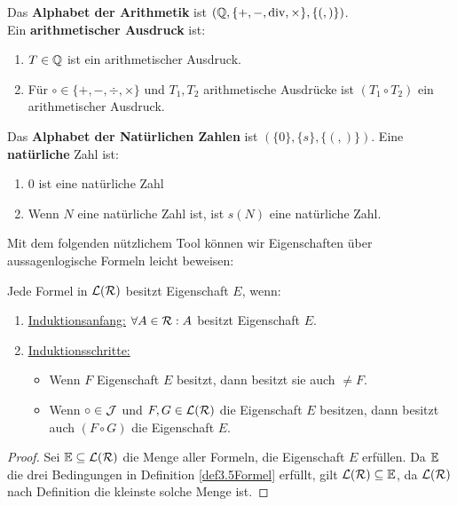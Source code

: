 \begin{beispiel}
	Das \textbf{Alphabet der Arithmetik} ist $(\mathbb{Q},\lbrace+,-,\operatorname{div},\times\rbrace,\lbrace(,)\rbrace)$.\\
	Ein \textbf{arithmetischer Ausdruck} ist:
	\begin{enumerate}
		\item $T\in\mathbb{Q}$ ist ein arithmetischer Ausdruck.
		\item Für $\circ\in\lbrace+,-,\div,\times\rbrace$ und $T_1,T_2$ arithmetische Ausdrücke ist $(T_1\circ T_2)$ ein arithmetischer Ausdruck.
	\end{enumerate}
\end{beispiel}

\begin{beispiel}
	Das \textbf{Alphabet der Natürlichen Zahlen} ist $(\lbrace 0\rbrace,\lbrace s\rbrace,\lbrace(,)\rbrace)$.
	Eine \textbf{natürliche} Zahl ist:
	\begin{enumerate}
		\item $0$ ist eine natürliche Zahl
		\item Wenn $N$ eine natürliche Zahl ist, ist $s(N)$ eine natürliche Zahl.
	\end{enumerate}
\end{beispiel}

Mit dem folgenden nützlichem Tool können wir Eigenschaften über aussagenlogische Formeln leicht beweisen:

\begin{satz}\enter
	Jede Formel in $\mathcal{L}(\mathcal{R})$ besitzt Eigenschaft $E$, wenn:
	\begin{enumerate}
		\item \underline{Induktionsanfang:} $\forall A\in\mathcal{R}:A$ besitzt Eigenschaft $E$.
		\item \underline{Induktionsschritte:}
		\begin{itemize}
			\item Wenn $F$ Eigenschaft $E$ besitzt, dann besitzt sie auch $\neq F$.
			\item Wenn $\circ\in\mathcal{J}$ und $F,G\in\mathcal{L}(\mathcal{R})$ die Eigenschaft $E$ besitzen, dann besitzt auch $(F\circ G)$ die Eigenschaft $E$.
		\end{itemize}
	\end{enumerate}
\end{satz}

\begin{proof}
	Sei $\mathbb{E}\subseteq\mathcal{L}(\mathcal{R})$ die Menge aller Formeln, die Eigenschaft $E$ erfüllen.
	Da $\mathbb{E}$ die drei Bedingungen in Definition \ref{def3.5Formel} erfüllt, gilt $\mathcal{L}(\mathcal{R})\subseteq\mathbb{E}$, da $\mathcal{L}(\mathcal{R})$ nach Definition die kleinste solche Menge ist.
\end{proof}

